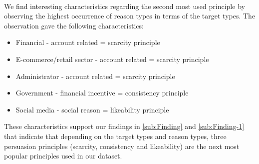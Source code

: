 \ \\
We find interesting characteristics regarding the second most used
principle by observing the highest occurrence of reason types in terms
of the target types. The observation gave the following characteristics:
\begin{itemize}
\item Financial - account related = scarcity principle
\item E-commerce/retail sector - account related = scarcity principle
\item Administrator - account related = scarcity principle
\item Government - financial incentive = consistency principle
\item Social media - social reason = likeability principle
\end{itemize}
These characteristics support our findings in \autoref{sub:Finding}
and \autoref{sub:Finding-1} that indicate that depending on the target
types and reason types, three persuasion principles (scarcity, consistency
and likeability) are the next most popular principles used in our
dataset.%

